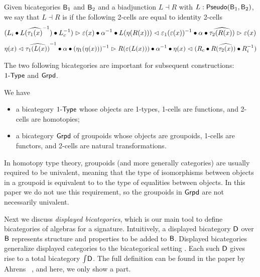\begin{definition}
Given bicategories $\mathsf{B}_1$ and $\mathsf{B}_2$ and a biadjunction $L \dashv R$ with $L : \mathsf{Pseudo}(\mathsf{B}_1, \mathsf{B}_2)$, we say that $L \dashv R$ is  if the following 2-cells are equal to identity 2-cells
\begin{equation*}
\begin{split}
({L}_i \bullet L(\widehat{\tau_1(x)}^{-1}) \bullet {L}_c^{-1}) \vartriangleright \varepsilon(x)
\bullet \alpha^{-1}
\bullet L(\eta(R(x))) \vartriangleleft \varepsilon_1(\varepsilon(x))^{-1}
\bullet \alpha
\bullet \widehat{\tau_2(R(x))} \vartriangleright \varepsilon(x)
\end{split}
\end{equation*}
\begin{equation*}
\begin{split}
\eta(x) \vartriangleleft \widehat{\tau_1(L(x))}^{-1}
\bullet \alpha
\bullet (\eta_1(\eta(x)))^{-1} \vartriangleright R(\varepsilon(L(x)))
\bullet \alpha^{-1}
\bullet \eta(x) \vartriangleleft ({R}_c \bullet R(\widehat{\tau_2(x)}) \bullet {R}_i^{-1})
\end{split}
\end{equation*}
\end{definition}

The two following bicategories are important for subsequent constructions:
$1\mbox{-}\mathsf{Type}$ and $\mathsf{Grpd}$.

\begin{example}
We have
\begin{itemize}
	\item a bicategory $1\mbox{-}\mathsf{Type}$ whose objects are 1-types, 1-cells are functions, and 2-cells are homotopies;
	\item a bicategory $\mathsf{Grpd}$ of groupoids
	whose objects are groupoids, 1-cells are functors, and 2-cells are natural transformations.
\end{itemize}
\end{example}
In homotopy type theory, groupoids (and more generally categories) are
usually required to be univalent, meaning that the type of isomorphisms between objects
in a groupoid is equivalent to to the type of equalities between objects. In this paper we
do not use this requirement, so the groupoids in $\mathsf{Grpd}$ are not
necessarily univalent.


Next we discuss \emph{displayed bicategories}, which is our main tool to define bicategories of algebras for a signature.
Intuitively, a displayed bicategory $\mathsf{D}$ over $\mathsf{B}$ represents structure and properties to be added to $\mathsf{B}$.
Displayed bicategories generalize displayed categories to the bicategorical setting \cite{AhrensL19}.
Each such $\mathsf{D}$ gives rise to a total bicategory $\textstyle \int_{}{\mathsf{D}}$.
The full definition can be found in the paper by Ahrens \etal \ \cite{bicatjournal}, and here, we only show a part.

